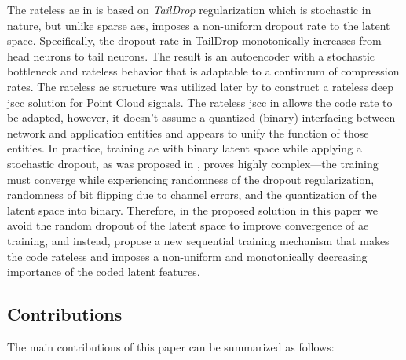 The rateless \gls{ae}  in \cite{koikeakino2020stochasticbottleneckratelessautoencoder} is based on \emph{TailDrop} regularization which is stochastic in nature, but unlike sparse \glspl{ae}, imposes  a non-uniform dropout rate to the latent space. Specifically, the dropout rate in TailDrop monotonically increases   from head neurons to tail neurons. The result is an autoencoder with a stochastic bottleneck and rateless behavior that is
adaptable to a continuum of compression rates. The rateless \gls{ae} structure was utilized later by \cite{10437920} to construct a rateless deep \gls{jscc} solution for Point Cloud signals. %
The rateless \gls{jscc} in \cite{10437920}  allows the  code rate to be adapted, however, it doesn't assume a quantized (binary) interfacing between network and application entities and appears to unify the function of those entities. In practice,  training \gls{ae}  with binary latent space while applying a stochastic dropout, as was proposed in \cite{koikeakino2020stochasticbottleneckratelessautoencoder}, proves  highly complex---the training must converge while experiencing randomness of the dropout regularization, randomness of bit flipping due to channel errors, and the quantization of the latent space into binary. Therefore, in the proposed solution in this paper we avoid the random dropout of the latent space to improve  convergence of  \gls{ae} training, and instead, propose a new sequential training mechanism that makes the code  rateless and imposes a  non-uniform and monotonically decreasing importance of the coded latent features.



\subsection{Contributions}

The main contributions of this paper can be summarized as follows:

